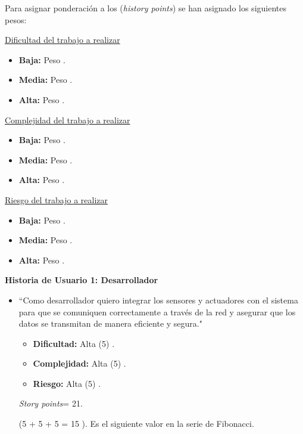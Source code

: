 \documentclass[
11pt, %
codirector, %
]{charter}
\begin{document}
Para asignar ponderación a los (\textit{history points}) se han asignado los
siguientes pesos:

\pagebreak

\underline{Dificultad del trabajo a realizar}
\begin{itemize}
	\item \textbf{Baja:} Peso .
	\item \textbf{Media:} Peso .
	\item \textbf{Alta:} Peso .
\end{itemize}

\underline{Complejidad del trabajo a realizar}
\begin{itemize}
	\item \textbf{Baja:} Peso .
	\item \textbf{Media:} Peso .
	\item \textbf{Alta:} Peso .
\end{itemize}

\underline{Riesgo del trabajo a realizar}
\begin{itemize}
	\item \textbf{Baja:} Peso .
	\item \textbf{Media:} Peso .
	\item \textbf{Alta:} Peso .
\end{itemize}

\textbf{Historia de Usuario 1: Desarrollador}
\begin{itemize}
	\item ``Como desarrollador quiero integrar los sensores y actuadores con el sistema para que se comuniquen correctamente a través de la
	      red y asegurar que los datos se transmitan de manera eficiente y segura."

	      \begin{itemize}
		      \item \textbf{Dificultad:} Alta (5) .
		      \item \textbf{Complejidad:} Alta (5) .
		      \item \textbf{Riesgo:} Alta (5) .
	      \end{itemize}

	      \textit{Story points}= 21.

	      (5 + 5 + 5 = 15 ). Es el siguiente valor en la serie de Fibonacci.

\end{itemize}
\end{document}
